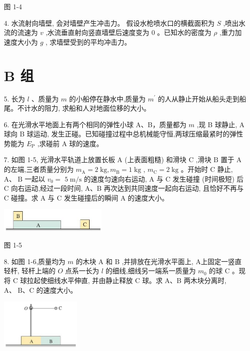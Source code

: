 \documentclass[10pt]{article}
\begin{document}
图 1-4

4. 水流射向墙壁, 会对墙壁产生冲击力。 假设水枪喷水口的横截面积为 \(S\) ,喷出水流的流速为 \(v\) ,水流垂直射向竖直墙壁后速度变为 0 。已知水的密度为 \(\rho\) ,重力加速度大小为 \(g\) , 求墙壁受到的平均冲击力。

\section*{B 组}

5. 长为 \(l\) 、质量为 \(m\) 的小船停在静水中,质量为 \({m}^{\prime }\) 的人从静止开始从船头走到船尾。不计水的阻力, 求船和人对地面位移的大小。

6. 在光滑水平地面上有两个相同的弹性小球 A、B，质量都为 \(m\) ,现 B 球静止, A 球向 B 球运动, 发生正碰。已知碰撞过程中总机械能守恒,两球压缩最紧时的弹性势能为 \({E}_{\mathrm{P}}\) ,求碰前 A 球的速度。

7. 如图 1-5, 光滑水平轨道上放置长板 \(\mathrm{A}\) (上表面粗糙) 和滑块 \(\mathrm{C}\) ,滑块 \(\mathrm{B}\) 置于 \(\mathrm{A}\) 的左端,三者质量分别为 \({m}_{\mathrm{A}} = 2\mathrm{\;{kg}},{m}_{\mathrm{B}} = 1\mathrm{\;{kg}}\) , \({m}_{\mathrm{C}} = 2\mathrm{\;{kg}}\) 。开始时 \(\mathrm{C}\) 静止, \(\mathrm{A}\text{、}\mathrm{\;B}\) 一起以 \({v}_{0} =\) \(5\mathrm{\;m}/\mathrm{s}\) 的速度匀速向右运动, \(\mathrm{A}\) 与 \(\mathrm{C}\) 发生碰撞 (时间极短) 后 \(\mathrm{C}\) 向右运动,经过一段时间, A、B 再次达到共同速度一起向右运动, 且恰好不再与 \(\mathrm{C}\) 碰撞。求 \(\mathrm{A}\) 与 \(\mathrm{C}\) 发生碰撞后的瞬间 \(\mathrm{A}\) 的速度大小。

\begin{center}
\includegraphics[max width=0.4\textwidth]{images/01910e4c-ebb8-7d2c-8f2f-2375bc1d2d12_35_807847.jpg}
\end{center}

图 1-5

8. 如图 1-6,质量均为 \(m\) 的木块 \(\mathrm{A}\) 和 \(\mathrm{B}\) ,并排放在光滑水平面上, A上固定一竖直轻杆, 轻杆上端的 \(O\) 点系一长为 \(l\) 的细线,细线另一端系一质量为 \({m}_{0}\) 的球 \(\mathrm{C}\) 。现将 \(\mathrm{C}\) 球拉起使细线水平伸直, 并由静止释放 C 球。求 A、B 两木块分离时, \(\mathrm{A}\text{、}\mathrm{\;B}\text{、}\mathrm{C}\) 的速度大小。

\begin{center}
\includegraphics[max width=0.3\textwidth]{images/01910e4c-ebb8-7d2c-8f2f-2375bc1d2d12_35_671562.jpg}
\end{center}
\end{document}
